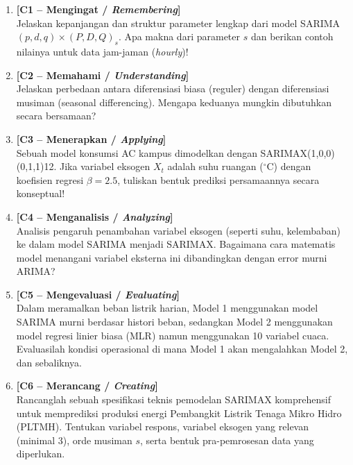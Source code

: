 \documentclass[11pt,a4paper]{article}
\begin{document}
\begin{enumerate}[leftmargin=1.8em, label=\textbf{Soal \arabic*.}]
    
    \item \textbf{[C1 -- Mengingat / \textit{Remembering}]} \\
    Jelaskan kepanjangan dan struktur parameter lengkap dari model SARIMA $(p,d,q) \times (P,D,Q)_s$. Apa makna dari parameter $s$ dan berikan contoh nilainya untuk data jam-jaman (\textit{hourly})!
    \vspace{2.2cm}

    \item \textbf{[C2 -- Memahami / \textit{Understanding}]} \\
    Jelaskan perbedaan antara diferensiasi biasa (reguler) dengan diferensiasi musiman (seasonal differencing). Mengapa keduanya mungkin dibutuhkan secara bersamaan?
    \vspace{2.8cm}

    \item \textbf{[C3 -- Menerapkan / \textit{Applying}]} \\
    Sebuah model konsumsi AC kampus dimodelkan dengan SARIMAX(1,0,0)(0,1,1)12. Jika variabel eksogen $X_t$ adalah suhu ruangan ($^\circ$C) dengan koefisien regresi $\beta = 2.5$, tuliskan bentuk prediksi persamaannya secara konseptual!
    \vspace{2.8cm}

    \newpage

    \item \textbf{[C4 -- Menganalisis / \textit{Analyzing}]} \\
    Analisis pengaruh penambahan variabel eksogen (seperti suhu, kelembaban) ke dalam model SARIMA menjadi SARIMAX. Bagaimana cara matematis model menangani variabel eksterna ini dibandingkan dengan error murni ARIMA?
    \vspace{3.5cm}

    \item \textbf{[C5 -- Mengevaluasi / \textit{Evaluating}]} \\
    Dalam meramalkan beban listrik harian, Model 1 menggunakan model SARIMA murni berdasar histori beban, sedangkan Model 2 menggunakan model regresi linier biasa (MLR) namun menggunakan 10 variabel cuaca. Evaluasilah kondisi operasional di mana Model 1 akan mengalahkan Model 2, dan sebaliknya.
    \vspace{3.5cm}

    \item \textbf{[C6 -- Merancang / \textit{Creating}]} \\
    Rancanglah sebuah spesifikasi teknis pemodelan SARIMAX komprehensif untuk memprediksi produksi energi Pembangkit Listrik Tenaga Mikro Hidro (PLTMH). Tentukan variabel respons, variabel eksogen yang relevan (minimal 3), orde musiman $s$, serta bentuk pra-pemrosesan data yang diperlukan.
    \vspace{4.5cm}

\end{enumerate}
\end{document}
